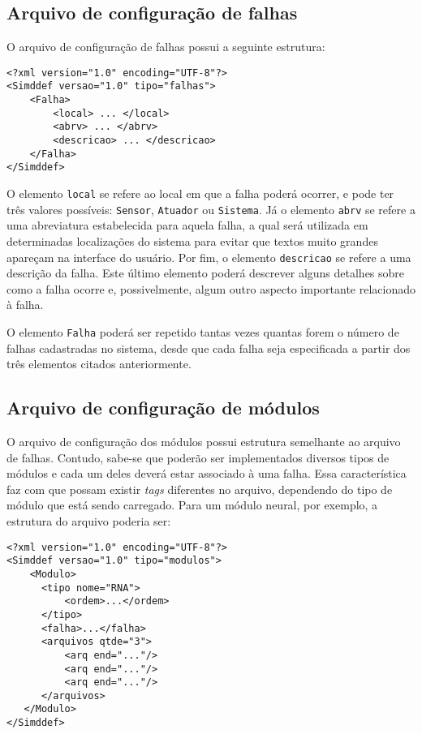 \subsection{Arquivo de configuração de falhas}
O arquivo de configuração de falhas possui a seguinte estrutura:

\vspace{1.1\topsep}
\begin{verbatim}
<?xml version="1.0" encoding="UTF-8"?>
<Simddef versao="1.0" tipo="falhas">
    <Falha>
        <local> ... </local>
        <abrv> ... </abrv>
        <descricao> ... </descricao>
    </Falha>
</Simddef>
\end{verbatim}
\vspace{1.1\topsep}

O elemento \verb|local| se refere ao local em que a falha poderá ocorrer, e pode
ter três valores possíveis: \verb|Sensor|, \verb|Atuador| ou \verb|Sistema|. Já
o elemento \verb|abrv| se refere a uma abreviatura estabelecida para aquela
falha, a qual será utilizada em determinadas localizações do sistema para evitar
que textos muito grandes apareçam na interface do usuário. Por fim, o elemento
\verb|descricao| se refere a uma descrição da falha. Este último elemento
poderá descrever alguns detalhes sobre como a falha ocorre e, possivelmente,
algum outro aspecto importante relacionado à falha.

O elemento \verb|Falha| poderá ser repetido tantas vezes quantas forem o número
de falhas cadastradas no sistema, desde que cada falha seja especificada a
partir dos três elementos citados anteriormente.

\subsection{Arquivo de configuração de módulos}
O arquivo de configuração dos módulos possui estrutura semelhante ao arquivo de
falhas. Contudo, sabe-se que poderão ser implementados diversos tipos de módulos
e cada um deles deverá estar associado à uma falha. Essa característica faz com
que possam existir {\it tags} diferentes no arquivo, dependendo do tipo de
módulo que está sendo carregado. Para um módulo neural, por exemplo, a estrutura
do arquivo poderia ser:

\vspace{1.1\topsep}
\begin{verbatim}
<?xml version="1.0" encoding="UTF-8"?>
<Simddef versao="1.0" tipo="modulos">
    <Modulo>
      <tipo nome="RNA">
          <ordem>...</ordem>
      </tipo>
      <falha>...</falha>
      <arquivos qtde="3">
          <arq end="..."/>
          <arq end="..."/>
          <arq end="..."/>
      </arquivos>
   </Modulo>
</Simddef>
\end{verbatim}
\vspace{1.1\topsep}

